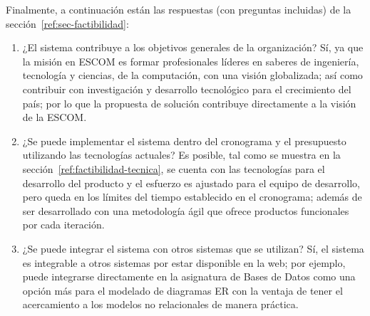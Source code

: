 Finalmente, a continuación están las respuestas (con preguntas incluidas) de la sección~\ref{ref:sec-factibilidad}:


\begin{enumerate}
    \item ¿El sistema contribuye a los objetivos generales de la organización? Sí, ya que la misión en ESCOM es formar profesionales líderes en saberes de ingeniería, tecnología y ciencias, de la computación, con una visión globalizada; así como contribuir con investigación y desarrollo tecnológico para el crecimiento del país; por lo que la propuesta de solución contribuye directamente a la visión de la ESCOM.
    \item ¿Se puede implementar el sistema dentro del cronograma y el presupuesto utilizando las tecnologías actuales? Es posible, tal como se muestra en la sección~\ref{ref:factibilidad-tecnica}, se cuenta con las tecnologías para el desarrollo del producto y el esfuerzo es ajustado para el equipo de desarrollo, pero queda en los límites del tiempo establecido en el cronograma; además de ser desarrollado con una metodología ágil que ofrece productos funcionales por cada iteración.
    \item ¿Se puede integrar el sistema con otros sistemas que se utilizan? Sí, el sistema es integrable a otros sistemas por estar disponible en la web; por ejemplo, puede integrarse directamente en la asignatura de Bases de Datos como una opción más para el modelado de diagramas ER con la ventaja de tener el acercamiento a los modelos no relacionales de manera práctica.
\end{enumerate}